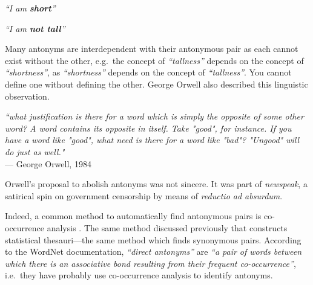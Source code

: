 \begin{center}
    \textit{``I am \textbf{short}''}
    
    \textit{``I am \textbf{not tall}''}
\end{center}

Many antonyms are interdependent with their antonymous pair as each cannot exist without the other, e.g.\ the concept of \textit{``tallness''} depends on the concept of \textit{``shortness''}, as \textit{``shortness''} depends on the concept of \textit{``tallness''}. You cannot define one without defining the other. George Orwell also described this linguistic observation.

\begin{center}
    \textit{``what justification is there for a word which is simply the opposite of some other word? A word contains its opposite in itself. Take "good", for instance. If you have a word like "good", what need is there for a word like "bad"? "Ungood" will do just as well."}
    \\ --- George Orwell, 1984
\end{center}

Orwell's proposal to abolish antonyms was not sincere. It was part of \textit{newspeak}, a satirical spin on government censorship by means of \textit{reductio ad absurdum}.

Indeed, a common method to automatically find antonymous pairs is co-occurrence analysis \cite{JusteonKatz1991, justeson1991co}. The same method discussed previously that constructs statistical thesauri—the same method which finds synonymous pairs. According to the WordNet documentation, \textit{``direct antonyms''} are \textit{``a pair of words between which there is an associative bond resulting from their frequent co-occurrence''}, i.e.\ they have probably use co-occurrence analysis to identify antonyms.



